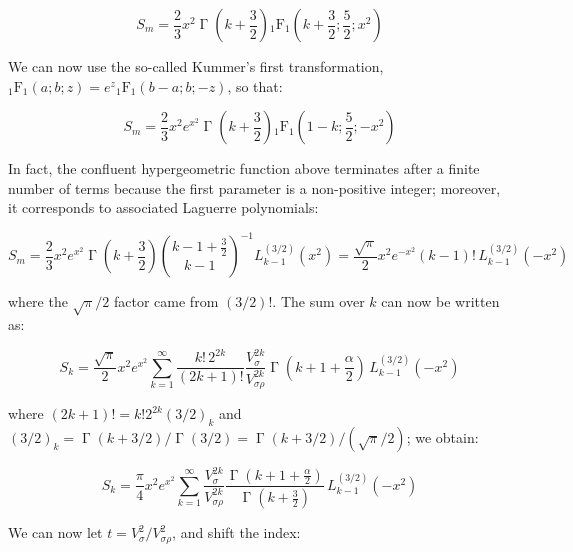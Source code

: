 \begin{equation*}
    S_m=\frac{2}{3}x^2 \operatorname{\Gamma}{\left(k+\frac{3}{2}\right)}\operatorname{_1F_1}{\left(k+\frac{3}{2};\frac{5}{2};x^2\right)}
\end{equation*}

We can now use the so-called Kummer's first transformation, $\operatorname{_1F_1}{\left(a;b;z\right)}=e^z\operatorname{_1F_1}{\left(b-a;b;-z\right)}$, so that:

\begin{equation*}
    S_m=\frac{2}{3}x^2e^{x^2}\operatorname{\Gamma}{\left(k+\frac{3}{2}\right)}\operatorname{_1F_1}{\left(1-k;\frac{5}{2};-x^2\right)}
\end{equation*}

In fact, the confluent hypergeometric function above terminates after a finite number of terms because the first parameter is a non-positive integer; moreover, it corresponds to associated Laguerre polynomials:

\begin{equation*}
    S_m=\frac{2}{3}x^2e^{x^2}\operatorname{\Gamma}{\left(k+\frac{3}{2}\right)}\binom{k-1+\frac{3}{2}}{k-1}^{-1}L_{k-1}^{(3/2)}\left(x^2\right)=\frac{\sqrt{\pi}}{2}x^2e^{-x^2}(k-1)!\,L_{k-1}^{(3/2)}\left(-x^2\right)
\end{equation*}

where the $\sqrt{\pi}/2$ factor came from $(3/2)!$. The sum over $k$ can now be written as:

\begin{equation*}
    S_k=\frac{\sqrt{\pi}}{2}x^2e^{x^2}\sum_{k=1}^\infty \frac{k!\,2^{2k}}{(2k+1)!}\frac{V_\sigma^{2k}}{V_{\sigma\rho}^{2k}}\operatorname{\Gamma}{\left(k+1+\frac{\alpha}{2}\right)}\,L_{k-1}^{(3/2)}\left(-x^2\right)
\end{equation*}

where $(2k+1)! =k!2^{2k}(3/2)_k$ and $(3/2)_k=\operatorname{\Gamma}{\left(k+3/2\right)}/\operatorname{\Gamma}{(3/2)}=\operatorname{\Gamma}{\left(k+3/2\right)}/(\sqrt{\pi}/2)$; we obtain:

\begin{equation*}
    S_k=\frac{\pi}{4}x^2e^{x^2}\sum_{k=1}^\infty \frac{V_\sigma^{2k}}{V_{\sigma\rho}^{2k}}\frac{\operatorname{\Gamma}{\left(k+1+\frac{\alpha}{2}\right)}}{\operatorname{\Gamma}{\left(k+\frac{3}{2}\right)}}\,L_{k-1}^{(3/2)}\left(-x^2\right)
\end{equation*}

We can now let $t=V_\sigma^2/V_{\sigma\rho}^2$, and shift the index:

